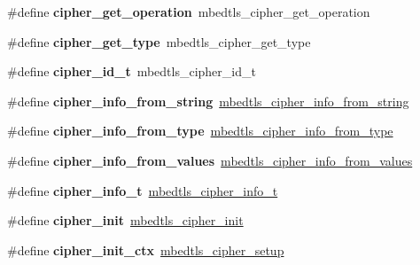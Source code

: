 \begin{DoxyCompactItemize}
\#define {\bfseries cipher\+\_\+get\+\_\+operation}~mbedtls\+\_\+cipher\+\_\+get\+\_\+operation
\item 
\mbox{\label{compat-1_83_8h_ac71941210d20fd930ce621a4534359a2}} 
\#define {\bfseries cipher\+\_\+get\+\_\+type}~mbedtls\+\_\+cipher\+\_\+get\+\_\+type
\item 
\mbox{\label{compat-1_83_8h_a6445ec56e80857f7c4cd65f8fd45c792}} 
\#define {\bfseries cipher\+\_\+id\+\_\+t}~mbedtls\+\_\+cipher\+\_\+id\+\_\+t
\item 
\mbox{\label{compat-1_83_8h_aef3b85d367d312cb50ee5d66eedb0907}} 
\#define {\bfseries cipher\+\_\+info\+\_\+from\+\_\+string}~\mbox{\hyperlink{cipher_8h_a9b2e7d49ca82abe8c96b65645364e24b}{mbedtls\+\_\+cipher\+\_\+info\+\_\+from\+\_\+string}}
\item 
\mbox{\label{compat-1_83_8h_a33168be23ce32dc82463cfa19672c8d6}} 
\#define {\bfseries cipher\+\_\+info\+\_\+from\+\_\+type}~\mbox{\hyperlink{cipher_8h_a8bc2809cbd7c2357f41be8cf76eeed92}{mbedtls\+\_\+cipher\+\_\+info\+\_\+from\+\_\+type}}
\item 
\mbox{\label{compat-1_83_8h_ace01f14173f326813e1441dc6b7aff64}} 
\#define {\bfseries cipher\+\_\+info\+\_\+from\+\_\+values}~\mbox{\hyperlink{cipher_8h_a9752d8056c43948c08d2e1f2009a53aa}{mbedtls\+\_\+cipher\+\_\+info\+\_\+from\+\_\+values}}
\item 
\mbox{\label{compat-1_83_8h_a210b7cc53c68e1419be4a9a957c93621}} 
\#define {\bfseries cipher\+\_\+info\+\_\+t}~\mbox{\hyperlink{structmbedtls__cipher__info__t}{mbedtls\+\_\+cipher\+\_\+info\+\_\+t}}
\item 
\mbox{\label{compat-1_83_8h_a4eae2e53780ff03c2da6859527440e21}} 
\#define {\bfseries cipher\+\_\+init}~\mbox{\hyperlink{cipher_8h_a80354364e91cdb4d4e6ab7ecec65fe07}{mbedtls\+\_\+cipher\+\_\+init}}
\item 
\mbox{\label{compat-1_83_8h_adc7705a423b2014936f0531110f20d2d}} 
\#define {\bfseries cipher\+\_\+init\+\_\+ctx}~\mbox{\hyperlink{cipher_8h_a009056b59d69abba5843ce78cd9aae1c}{mbedtls\+\_\+cipher\+\_\+setup}}
\item 

\end{DoxyCompactItemize}
